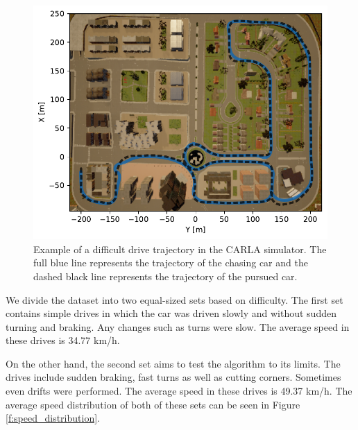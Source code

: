 \documentclass{ctuthesis/ctuthesis}
\begin{document}
\begin{figure}[]
    \centering
    \includegraphics[width=1\textwidth]{images/trajectory_img_h.pdf}
    \caption{Example of a difficult drive trajectory in the CARLA simulator. The full blue line represents the trajectory of the chasing car and the dashed black line represents the trajectory of the pursued car. }\label{f:trajectory}
\end{figure}


We divide the dataset into two equal-sized sets based on difficulty. The first set contains simple drives in which the car was driven slowly and without sudden turning and braking. Any changes such as turns were slow. The average speed in these drives is 34.77 km/h.\par


On the other hand, the second set aims to test the algorithm to its limits. The drives include sudden braking, fast turns as well as cutting corners. Sometimes even drifts were performed. The average speed in these drives is 49.37 km/h. The average speed distribution of both of these sets can be seen in Figure \ref{f:speed_distribution}.
\end{document}
